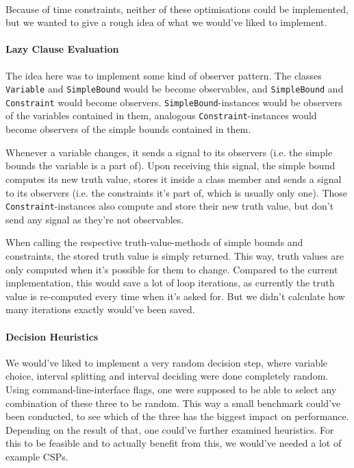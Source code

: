 \paragraph{}
Because of time constraints, neither of these optimisations could be implemented, but we wanted to give a rough idea of what we would've liked to implement.

\paragraph{Lazy Clause Evaluation}
The idea here was to implement some kind of observer pattern.
The classes \texttt{Variable} and \texttt{SimpleBound} would be become observables, and \texttt{SimpleBound} and \texttt{Constraint} would become observers.
\texttt{SimpleBound}-instances would be observers of the variables contained in them, analogous \texttt{Constraint}-instances would become observers of the simple bounds contained in them.

Whenever a variable changes, it sends a signal to its observers (i.e. the simple bounds the variable is a part of).
Upon receiving this signal, the simple bound computes its new truth value, stores it inside a class member and sends a signal to its observers (i.e. the constraints it's part of, which is usually only one).
Those \texttt{Constraint}-instances also compute and store their new truth value, but don't send any signal as they're not observables.

When calling the respective truth-value-methods of simple bounds and constraints, the stored truth value is simply returned.
This way, truth values are only computed when it's possible for them to change.
Compared to the current implementation, this would save a lot of loop iterations, as currently the truth value is re-computed every time when it's asked for.
But we didn't calculate how many iterations exactly would've been saved.


\paragraph{Decision Heuristics}
We would've liked to implement a very random decision step, where variable choice, interval splitting and interval deciding were done completely random.
Using command-line-interface flags, one were supposed to be able to select any combination of these three to be random.
This way a small benchmark could've been conducted, to see which of the three has the biggest impact on performance.
Depending on the result of that, one could've further examined heuristics.
For this to be feasible and to actually benefit from this, we would've needed a lot of example CSPs.
